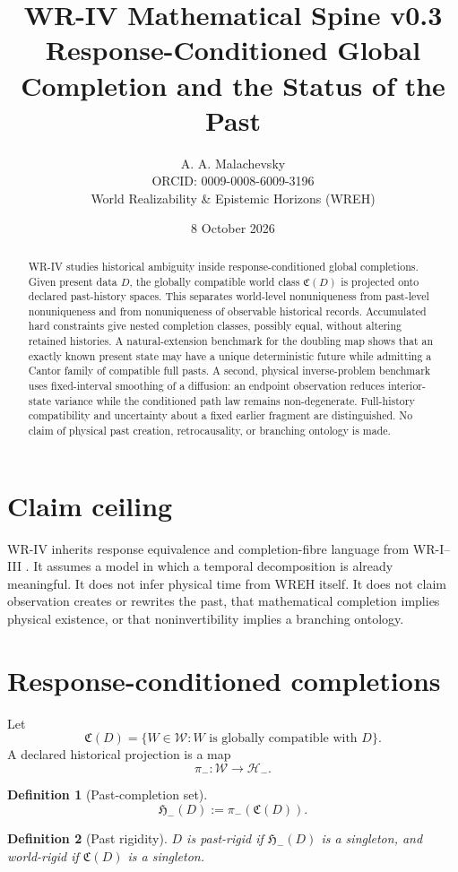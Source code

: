\documentclass[11pt]{article}
\title{\textbf{WR-IV Mathematical Spine v0.3}\\[4pt]\large Response-Conditioned Global Completion and the Status of the Past}
\author{A. A. Malachevsky\\ORCID: 0009-0008-6009-3196\\World Realizability \& Epistemic Horizons (WREH)}
\date{8 October 2026}
\newtheorem{definition}{Definition}[section]
\newcommand{\Wcal}{\mathcal W}
\newcommand{\Ccal}{\mathfrak C}
\newcommand{\Hminus}{\mathcal H_-}
\newcommand{\Pcal}{\mathfrak H_-}
\begin{document}
\maketitle

\begin{abstract}
WR-IV studies historical ambiguity inside response-conditioned global completions. Given present data $D$, the globally compatible world class $\Ccal(D)$ is projected onto declared past-history spaces. This separates world-level nonuniqueness from past-level nonuniqueness and from nonuniqueness of observable historical records. Accumulated hard constraints give nested completion classes, possibly equal, without altering retained histories. A natural-extension benchmark for the doubling map shows that an exactly known present state may have a unique deterministic future while admitting a Cantor family of compatible full pasts. A second, physical inverse-problem benchmark uses fixed-interval smoothing of a diffusion: an endpoint observation reduces interior-state variance while the conditioned path law remains non-degenerate. Full-history compatibility and uncertainty about a fixed earlier fragment are distinguished. No claim of physical past creation, retrocausality, or branching ontology is made.
\end{abstract}

\section{Claim ceiling}
WR-IV inherits response equivalence and completion-fibre language from
WR-I--III \cite{WRI,WRII,WRIII}. It assumes a model in which a temporal
decomposition is already meaningful. It does not infer physical time from WREH itself. It does not claim observation creates or rewrites the past, that mathematical completion implies physical existence, or that noninvertibility implies a branching ontology.

\section{Response-conditioned completions}
Let
\[
\Ccal(D)=\{W\in\Wcal: W\text{ is globally compatible with }D\}.
\]
A declared historical projection is a map
\[
\pi_-:\Wcal\to\Hminus.
\]
\begin{definition}[Past-completion set]
\[
\Pcal(D):=\pi_-(\Ccal(D)).
\]
\end{definition}
\begin{definition}[Past rigidity]
$D$ is past-rigid if $\Pcal(D)$ is a singleton, and world-rigid if $\Ccal(D)$ is a singleton.
\end{definition}
\end{document}
